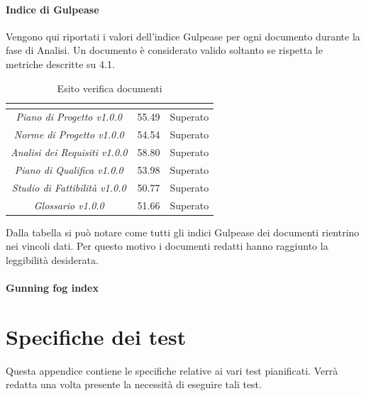 \paragraph{Indice di Gulpease} \Spazio
Vengono qui riportati i valori dell'indice Gulpease per ogni documento durante la fase
di Analisi. Un documento è considerato valido soltanto se rispetta le metriche descritte
su 4.1.
\renewcommand{\arraystretch}{1.5}
\begin{table}[H]
	\begin{center}
		\begin{tabular}{|c|c|c|}
			\hline
			\rowcolor{title_row}
			\textbf{\color{title_text}{Documento}} & \textbf{\color{title_text}{Valore indice}} & \textbf{\color{title_text}{Esito}} \\
			\hline
			\emph{Piano di Progetto v1.0.0} & {55.49} & {Superato}\\
			\hline
			\emph{Norme di Progetto v1.0.0} & {54.54} & {Superato}\\
			\hline
			\emph{Analisi dei Requisiti v1.0.0} & {58.80} & {Superato}\\
			\hline
			\emph{Piano di Qualifica v1.0.0} & {53.98} & {Superato}\\
			\hline
			\emph{Studio di Fattibilità v1.0.0} & {50.77} & {Superato}\\
			\hline
			\emph{Glossario v1.0.0} & {51.66} & {Superato}\\
			\hline
		\end{tabular}
		\caption[Esiti verifica documenti, Analisi]{Esito verifica documenti}
		\label{tabella:verifica documenti}
	\end{center}
\end{table}
\renewcommand{\arraystretch}{1}

Dalla tabella si può notare come tutti gli indici Gulpease dei documenti rientrino nei vincoli dati. Per questo motivo i documenti redatti hanno raggiunto la leggibilità desiderata.

\paragraph{Gunning fog index} \Spazio

\section{Specifiche dei test}
Questa appendice contiene le specifiche relative ai vari test pianificati. Verrà redatta una volta presente la necessità di eseguire tali test.
